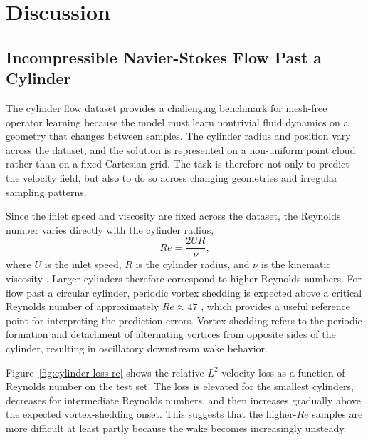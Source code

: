 \section{Discussion}

\subsection{Incompressible Navier-Stokes Flow Past a Cylinder}

The cylinder flow dataset provides a challenging benchmark for mesh-free operator learning because the model must learn nontrivial fluid dynamics on a geometry that changes between samples. The cylinder radius and position vary across the dataset, and the solution is represented on a non-uniform point cloud rather than on a fixed Cartesian grid. The task is therefore not only to predict the velocity field, but also to do so across changing geometries and irregular sampling patterns.

Since the inlet speed and viscosity are fixed across the dataset, the Reynolds number varies directly with the cylinder radius,
\begin{equation}
Re = \frac{2UR}{\nu},
\end{equation}
where \(U\) is the inlet speed, \(R\) is the cylinder radius, and \(\nu\) is the kinematic viscosity \cite{cylinder-flow-re}. Larger cylinders therefore correspond to higher Reynolds numbers. For flow past a circular cylinder, periodic vortex shedding is expected above a critical Reynolds number of approximately \(Re\approx47\) \cite{cylinder-wake}, which provides a useful reference point for interpreting the prediction errors. Vortex shedding refers to the periodic formation and detachment of alternating vortices from opposite sides of the cylinder, resulting in oscillatory downstream wake behavior.

Figure~\ref{fig:cylinder-loss-re} shows the relative \(L^2\) velocity loss as a function of Reynolds number on the test set. The loss is elevated for the smallest cylinders, decreases for intermediate Reynolds numbers, and then increases gradually above the expected vortex-shedding onset. This suggests that the higher-\(Re\) samples are more difficult at least partly because the wake becomes increasingly unsteady. 

